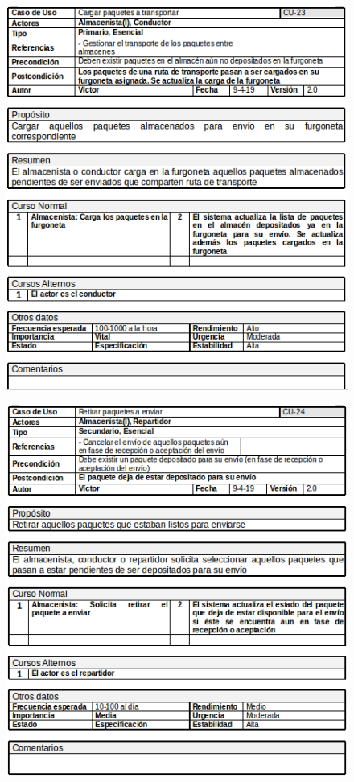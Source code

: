\begin{figure}[H]
	\centering
	\includegraphics[width=16cm]{23}
\end{figure}
\begin{figure}[H]
	\centering
	\includegraphics[width=16cm]{24}
\end{figure}
